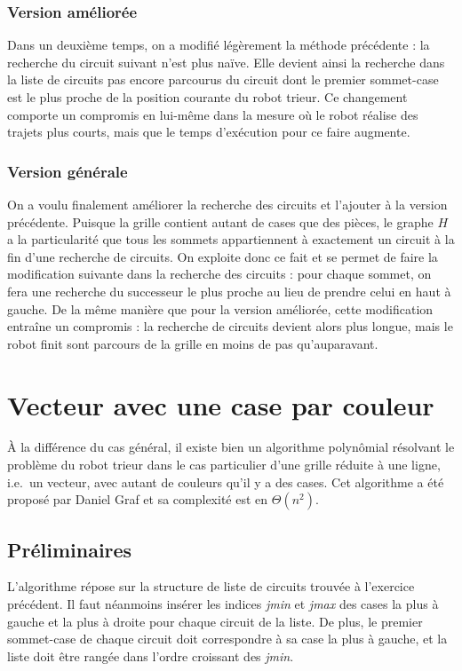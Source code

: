 \documentclass[12pt,a4paper]{article}
\begin{document}
\subsubsection*{Version am\'elior\'ee}
Dans un deuxi\`eme temps, on a modifi\'e l\'eg\`erement la m\'ethode 
pr\'ec\'edente : la recherche du circuit suivant n'est plus na\"ive. Elle 
devient ainsi la recherche dans la liste de circuits pas encore 
parcourus du circuit dont le premier sommet-case est le plus proche de la 
position courante du robot trieur. Ce changement comporte un compromis en 
lui-m\^eme dans la mesure o\`u le robot r\'ealise des trajets plus courts, mais 
que le temps d'ex\'ecution pour ce faire augmente.

\subsubsection*{Version g\'en\'erale}
On a voulu finalement am\'eliorer la recherche des circuits et l'ajouter \`a la 
version pr\'ec\'edente. Puisque la grille contient autant de cases que des 
pi\`eces, le graphe $H$ a la particularit\'e que tous les sommets appartiennent 
\`a exactement un circuit \`a la fin d'une recherche de circuits. On exploite 
donc ce fait et se permet de faire la modification suivante dans la recherche 
des circuits : pour chaque sommet, on fera une recherche du successeur le plus 
proche au lieu de prendre celui en haut \`a gauche. De la m\^eme mani\`ere que 
pour la version am\'elior\'ee, cette modification entra\^ine un compromis : la 
recherche de circuits devient alors plus longue, mais le robot finit sont 
parcours de la grille en moins de pas qu'auparavant.

\section{Vecteur avec une case par couleur}
\`A la diff\'erence du cas g\'en\'eral, il existe bien un algorithme 
polyn\^omial r\'esolvant
le probl\`eme du robot trieur dans le cas particulier d'une grille r\'eduite \`a une
ligne, i.e.\ un vecteur, avec autant de couleurs qu'il y a des cases. Cet
algorithme a \'et\'e propos\'e par Daniel Graf et sa complexit\'e est en 
$\Theta(n^2)$.

\subsection*{Pr\'eliminaires}
L'algorithme r\'epose sur la structure de liste de circuits trouv\'ee \`a l'exercice
pr\'ec\'edent. Il faut n\'eanmoins ins\'erer les indices {\itshape jmin} et 
{\itshape jmax} des cases la plus \`a gauche et la plus \`a droite pour chaque 
circuit de la liste.
De plus, le premier sommet-case de chaque circuit doit correspondre \`a sa case 
la plus \`a gauche, et la liste doit \^etre rang\'ee dans l'ordre croissant des 
{\itshape jmin}.
\end{document}
